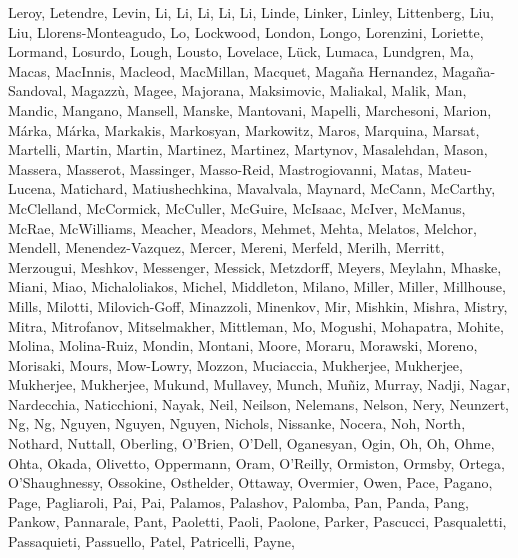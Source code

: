 \documentclass[times,tight]{aastex631}
\begin{document}
\begin{thebibliography}{}
{  {Leroy}, {Letendre}, {Levin}, {Li}, {Li}, {Li}, {Li}, {Li}, {Linde},
  {Linker}, {Linley}, {Littenberg}, {Liu}, {Liu}, {Llorens-Monteagudo}, {Lo},
  {Lockwood}, {London}, {Longo}, {Lorenzini}, {Loriette}, {Lormand}, {Losurdo},
  {Lough}, {Lousto}, {Lovelace}, {L{\"u}ck}, {Lumaca}, {Lundgren}, {Ma},
  {Macas}, {MacInnis}, {Macleod}, {MacMillan}, {Macquet}, {Maga{\~n}a
  Hernandez}, {Maga{\~n}a-Sandoval}, {Magazz{\`u}}, {Magee}, {Majorana},
  {Maksimovic}, {Maliakal}, {Malik}, {Man}, {Mandic}, {Mangano}, {Mansell},
  {Manske}, {Mantovani}, {Mapelli}, {Marchesoni}, {Marion}, {M{\'a}rka},
  {M{\'a}rka}, {Markakis}, {Markosyan}, {Markowitz}, {Maros}, {Marquina},
  {Marsat}, {Martelli}, {Martin}, {Martin}, {Martinez}, {Martinez}, {Martynov},
  {Masalehdan}, {Mason}, {Massera}, {Masserot}, {Massinger}, {Masso-Reid},
  {Mastrogiovanni}, {Matas}, {Mateu-Lucena}, {Matichard}, {Matiushechkina},
  {Mavalvala}, {Maynard}, {McCann}, {McCarthy}, {McClelland}, {McCormick},
  {McCuller}, {McGuire}, {McIsaac}, {McIver}, {McManus}, {McRae}, {McWilliams},
  {Meacher}, {Meadors}, {Mehmet}, {Mehta}, {Melatos}, {Melchor}, {Mendell},
  {Menendez-Vazquez}, {Mercer}, {Mereni}, {Merfeld}, {Merilh}, {Merritt},
  {Merzougui}, {Meshkov}, {Messenger}, {Messick}, {Metzdorff}, {Meyers},
  {Meylahn}, {Mhaske}, {Miani}, {Miao}, {Michaloliakos}, {Michel}, {Middleton},
  {Milano}, {Miller}, {Miller}, {Millhouse}, {Mills}, {Milotti},
  {Milovich-Goff}, {Minazzoli}, {Minenkov}, {Mir}, {Mishkin}, {Mishra},
  {Mistry}, {Mitra}, {Mitrofanov}, {Mitselmakher}, {Mittleman}, {Mo},
  {Mogushi}, {Mohapatra}, {Mohite}, {Molina}, {Molina-Ruiz}, {Mondin},
  {Montani}, {Moore}, {Moraru}, {Morawski}, {Moreno}, {Morisaki}, {Mours},
  {Mow-Lowry}, {Mozzon}, {Muciaccia}, {Mukherjee}, {Mukherjee}, {Mukherjee},
  {Mukherjee}, {Mukund}, {Mullavey}, {Munch}, {Mu{\~n}iz}, {Murray}, {Nadji},
  {Nagar}, {Nardecchia}, {Naticchioni}, {Nayak}, {Neil}, {Neilson}, {Nelemans},
  {Nelson}, {Nery}, {Neunzert}, {Ng}, {Ng}, {Nguyen}, {Nguyen}, {Nguyen},
  {Nichols}, {Nissanke}, {Nocera}, {Noh}, {North}, {Nothard}, {Nuttall},
  {Oberling}, {O'Brien}, {O'Dell}, {Oganesyan}, {Ogin}, {Oh}, {Oh}, {Ohme},
  {Ohta}, {Okada}, {Olivetto}, {Oppermann}, {Oram}, {O'Reilly}, {Ormiston},
  {Ormsby}, {Ortega}, {O'Shaughnessy}, {Ossokine}, {Osthelder}, {Ottaway},
  {Overmier}, {Owen}, {Pace}, {Pagano}, {Page}, {Pagliaroli}, {Pai}, {Pai},
  {Palamos}, {Palashov}, {Palomba}, {Pan}, {Panda}, {Pang}, {Pankow},
  {Pannarale}, {Pant}, {Paoletti}, {Paoli}, {Paolone}, {Parker}, {Pascucci},
  {Pasqualetti}, {Passaquieti}, {Passuello}, {Patel}, {Patricelli}, {Payne},
}
\end{thebibliography}
\end{document}
